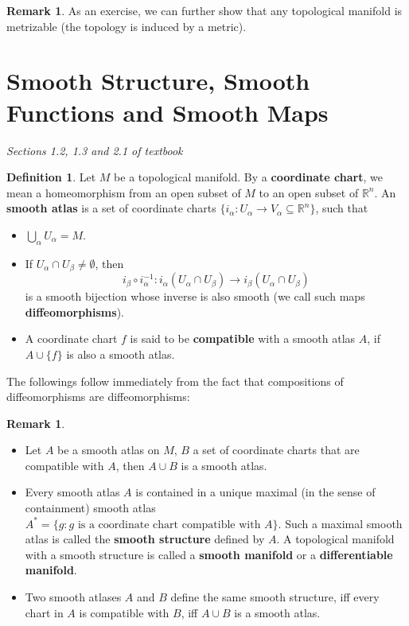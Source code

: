 \documentclass{article}
\theoremstyle{definition}
\newtheorem{dfn}[thm]{Definition}
\newtheorem{rmk}[thm]{Remark}
\begin{document}
\begin{rmk}
    As an exercise, we can further show that any topological manifold is metrizable (the topology is induced by a metric).
\end{rmk}

\newpage

\section{Smooth Structure, Smooth Functions and Smooth Maps}

{\em Sections 1.2, 1.3 and 2.1 of textbook}\\

\begin{dfn}
    Let $M$ be a topological manifold. By a {\bf coordinate chart}, we mean a homeomorphism from an open subset of $M$ to an open subset of $\mathbb{R}^n$. An {\bf smooth atlas} is a set of coordinate charts $\{i_\alpha: U_\alpha\rightarrow V_\alpha\subseteq \mathbb{R}^n\}$, such that
    \begin{itemize}
        \item $\bigcup_\alpha U_\alpha=M$.
        \item If $U_\alpha\cap U_\beta\not=\emptyset$, then 
        \[i_\beta\circ i_\alpha^{-1}: i_\alpha(U_\alpha\cap U_\beta)\rightarrow i_\beta(U_\alpha\cap U_\beta)\]
        is a smooth bijection whose inverse is also smooth (we call such maps {\bf diffeomorphisms}).
        \item A coordinate chart $f$ is said to be {\bf compatible} with a smooth atlas $A$, if $A\cup\{f\}$ is also a smooth atlas.
    \end{itemize}
\end{dfn}

The followings follow immediately from the fact that compositions of diffeomorphisms are diffeomorphisms:

\begin{rmk}\label{ssts}
    \begin{itemize}
        \item Let $A$ be a smooth atlas on $M$, $B$ a set of coordinate charts that are compatible with $A$, then $A\cup B$ is a smooth atlas.
        \item Every smooth atlas $A$ is contained in a unique maximal (in the sense of containment) smooth atlas $A^*=\{g: g\text{ is a coordinate chart compatible with }A\}$. Such a maximal smooth atlas is called the {\bf smooth structure} defined by $A$. A topological manifold with a smooth structure is called a {\bf smooth manifold} or a {\bf differentiable manifold}.
        \item Two smooth atlases $A$ and $B$ define the same smooth structure, iff every chart in $A$ is compatible with $B$, iff $A\cup B$ is a smooth atlas.
    \end{itemize}    
\end{rmk}
\end{document}
